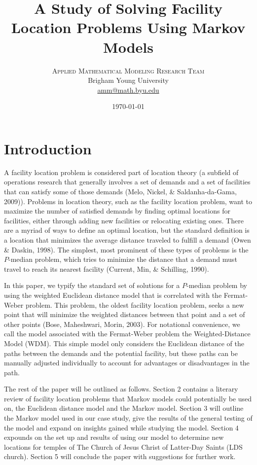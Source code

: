 \documentclass[twoside,twocolumn]{article}
\title{A Study of Solving Facility Location Problems Using Markov Models}
\author{
\textsc{Applied Mathematical Modeling Research Team}\\[1ex]
\normalsize Brigham Young University \\
\normalsize \href{mailto:amm@math.byu.edu}{amm@math.byu.edu}
}
\date{\today}
\begin{document}
\maketitle

\section{Introduction}

A facility location problem is considered part of location theory (a subfield of operations research that generally involves a set of demands and a set of facilities that can satisfy some of those demands (Melo, Nickel, \& Saldanha-da-Gama, 2009)).
Problems in location theory, such as the facility location problem, want to maximize the number of satisfied demands by finding optimal locations for facilities, either through adding new facilities or relocating existing ones.
There are a myriad of ways to define an optimal location, but the standard definition is a location that minimizes the average distance traveled to fulfill a demand (Owen \& Daskin, 1998).
The simplest, most prominent of these types of problems is the $P$-median problem, which tries to minimize the distance that a demand must travel to reach its nearest facility (Current, Min, \& Schilling, 1990).


In this paper, we typify the standard set of solutions for a $P$-median problem by using the weighted Euclidean distance model that is correlated with the Fermat-Weber problem.
This problem, the oldest facility location problem, seeks a new point that will minimize the weighted distances between that point and a set of other points (Bose, Maheshwari, Morin, 2003).
For notational convenience, we call the model associated with the Fermat-Weber problem the Weighted-Distance Model (WDM).
This simple model only considers the Euclidean distance of the paths between the demands and the potential facility, but these paths can be manually adjusted individually to account for advantages or disadvantages in the path.



The rest of the paper will be outlined as follows.
Section 2 contains a literary review of facility location problems that Markov models could potentially be used on, the Euclidean distance model and the Markov model.
Section 3 will outline the Markov model used in our case study, give the results of the general testing of the model and expand on insights gained while studying the model.
Section 4 expounds on the set up and results of using our model to determine new locations for temples of The Church of Jesus Christ of Latter-Day Saints (LDS church).
Section 5 will conclude the paper with suggestions for further work.
\end{document}
